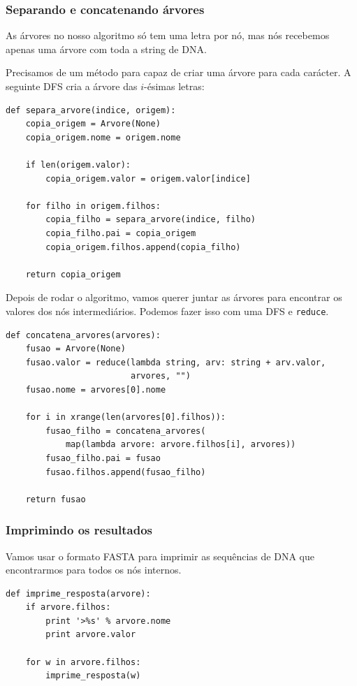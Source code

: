 \documentclass[11pt]{article}
\begin{document}
\subsubsection{Separando e concatenando árvores}
\label{sec-4-3-3}

As árvores no nosso algoritmo só tem uma letra por nó, mas nós
recebemos apenas uma árvore com toda a string de DNA.

Precisamos de um método para capaz de criar uma árvore para cada
carácter. A seguinte DFS cria a árvore das $i$-ésimas letras:
\begin{verbatim}
def separa_arvore(indice, origem):
    copia_origem = Arvore(None)
    copia_origem.nome = origem.nome

    if len(origem.valor):
        copia_origem.valor = origem.valor[indice]

    for filho in origem.filhos:
        copia_filho = separa_arvore(indice, filho)
        copia_filho.pai = copia_origem
        copia_origem.filhos.append(copia_filho)

    return copia_origem
\end{verbatim}


Depois de rodar o algoritmo, vamos querer juntar as árvores para encontrar
os valores dos nós intermediários. Podemos fazer isso com uma DFS e \verb~reduce~.
\begin{verbatim}
def concatena_arvores(arvores):
    fusao = Arvore(None)
    fusao.valor = reduce(lambda string, arv: string + arv.valor,
                         arvores, "")
    fusao.nome = arvores[0].nome

    for i in xrange(len(arvores[0].filhos)):
        fusao_filho = concatena_arvores(
            map(lambda arvore: arvore.filhos[i], arvores))
        fusao_filho.pai = fusao
        fusao.filhos.append(fusao_filho)

    return fusao
\end{verbatim}

\subsubsection{Imprimindo os resultados}
\label{sec-4-3-4}

Vamos usar o formato FASTA para imprimir as sequências de DNA que
encontrarmos para todos os nós internos.

\begin{verbatim}
def imprime_resposta(arvore):
    if arvore.filhos:
        print '>%s' % arvore.nome
        print arvore.valor

    for w in arvore.filhos:
        imprime_resposta(w)
\end{verbatim}
\end{document}
